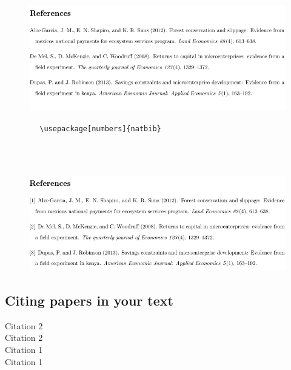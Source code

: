 \documentclass[12pts]{article}
\begin{document}
	\begin{verbatim}
		
	\end{verbatim}
	
	\begin{figure}[H]
		\centering
		\includegraphics[width=\linewidth]{../img/Chicago}
	\end{figure}

	\begin{verbatim}
		\usepackage[numbers]{natbib}
		
	\end{verbatim}
	
	\begin{verbatim}
		
	\end{verbatim}
	
	\begin{figure}[H]
		\centering
		\includegraphics[width=\linewidth]{../img/Chicago_numbers}
	\end{figure}
	
	
	\subsection{Citing papers in your text}
	
	Citation 2 \citet{dupas2013savings} \\
	Citation 2 \citep{dupas2013savings} \\
	
	Citation 1 \citet[p.~215]{dupas2013savings} \\
	Citation 1 \citep[p.~215]{dupas2013savings} \\
	
\end{document}

